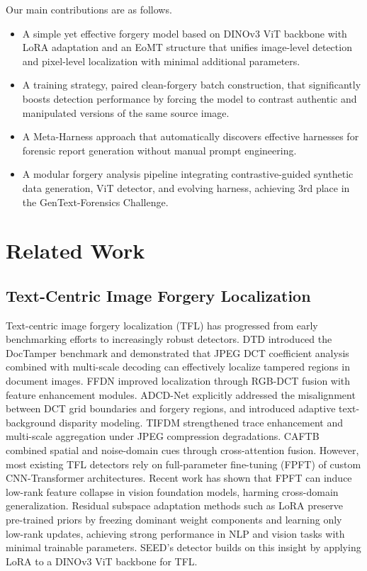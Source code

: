 \documentclass[sigconf, screen, review, anonymous]{acmart}
\begin{document}
Our main contributions are as follows.
\begin{itemize}
    \item A simple yet effective forgery model based on DINOv3 ViT backbone with LoRA adaptation and an EoMT structure that unifies image-level detection and pixel-level localization with minimal additional parameters.
    \item A training strategy, paired clean-forgery batch construction, that significantly boosts detection performance by forcing the model to contrast authentic and manipulated versions of the same source image.
    \item A Meta-Harness approach that automatically discovers effective harnesses for forensic report generation without manual prompt engineering.
    \item A modular forgery analysis pipeline integrating contrastive-guided synthetic data generation, ViT detector, and evolving harness, achieving 3rd place in the GenText-Forensics Challenge.
\end{itemize}

\section{Related Work}

\subsection{Text-Centric Image Forgery Localization}

Text-centric image forgery localization (TFL) has progressed from early benchmarking efforts to increasingly robust detectors. DTD \cite{qu2023towards} introduced the DocTamper benchmark and demonstrated that JPEG DCT coefficient analysis combined with multi-scale decoding can effectively localize tampered regions in document images. FFDN \cite{chen2024enhancing} improved localization through RGB-DCT fusion with feature enhancement modules. ADCD-Net \cite{wong2025adcd} explicitly addressed the misalignment between DCT grid boundaries and forgery regions, and introduced adaptive text-background disparity modeling. TIFDM \cite{dong2024robust} strengthened trace enhancement and multi-scale aggregation under JPEG compression degradations. CAFTB \cite{song2025cross} combined spatial and noise-domain cues through cross-attention fusion. However, most existing TFL detectors rely on full-parameter fine-tuning (FPFT) of custom CNN-Transformer architectures. Recent work \cite{yan2024orthogonal} has shown that FPFT can induce low-rank feature collapse in vision foundation models, harming cross-domain generalization. Residual subspace adaptation methods such as LoRA \cite{hu2021lora} preserve pre-trained priors by freezing dominant weight components and learning only low-rank updates, achieving strong performance in NLP and vision tasks with minimal trainable parameters. SEED's detector builds on this insight by applying LoRA to a DINOv3 ViT backbone for TFL.
\end{document}
